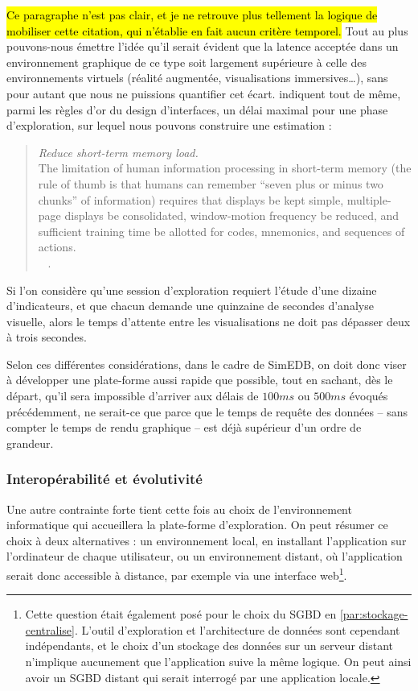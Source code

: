 \hl{Ce paragraphe n'est pas clair, et je ne retrouve plus tellement la logique de mobiliser cette citation, qui n'établie en fait aucun critère temporel.}
Tout au plus pouvons-nous émettre l'idée qu'il serait évident que la latence acceptée dans un environnement graphique de ce type soit largement supérieure à celle des environnements virtuels (réalité augmentée, visualisations immersives\ldots), sans pour autant que nous ne puissions quantifier cet écart.
 indiquent tout de même, parmi les  règles d'or du design d'interfaces\fg{}, un délai maximal pour une phase d'exploration, sur lequel nous pouvons construire une estimation :
\begin{quotation}
 	\noindent\og
 	[Règle 8.] \textit{Reduce short-term memory load.}\\
	The limitation of human information processing in short-term memory (the rule of thumb is that humans can remember ``seven plus or minus two chunks'' of information) requires that displays be kept simple, multiple-page displays be consolidated, window-motion frequency be reduced, and sufficient training time be allotted for codes, mnemonics, and sequences of actions.
	\fg{}\\
	\mbox{}~ \hfill  \cite[75]{shneiderman_designing_2004}.
\end{quotation}

Si l'on considère qu'une session d'exploration requiert l'étude d'une dizaine d'indicateurs, et que chacun demande une quinzaine de secondes d'analyse visuelle, alors le temps d'attente entre les visualisations ne doit pas dépasser deux à trois secondes.

Selon ces différentes considérations, dans le cadre de SimEDB, on doit donc viser à développer une plate-forme aussi rapide que possible, tout en sachant, dès le départ, qu'il sera impossible d'arriver aux délais de $100ms$ ou $500ms$ évoqués précédemment, ne serait-ce que parce que le temps de requête des données -- sans compter le temps de rendu graphique -- est déjà supérieur d'un ordre de grandeur.

\subsubsection{Interopérabilité et évolutivité}

Une autre contrainte forte tient cette fois au choix de l'environnement informatique qui accueillera la plate-forme d'exploration.
On peut résumer ce choix à deux alternatives : un environnement local, en installant l'application sur l'ordinateur de chaque utilisateur, ou un environnement distant, où l'application serait donc accessible à distance, par exemple via une interface web\footnote{
Cette question était également posé pour le choix du SGBD en \cref{par:stockage-centralise}.
L'outil d'exploration et l'architecture de données sont cependant indépendants, et le choix d'un stockage des données sur un serveur distant n'implique aucunement que l'application suive la même logique.
On peut ainsi avoir un SGBD distant qui serait interrogé par une application locale.
}.

